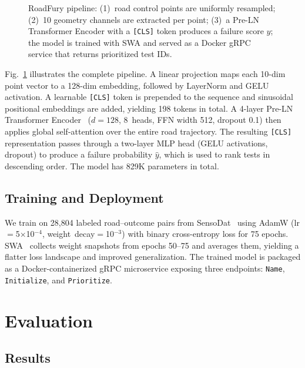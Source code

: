 \documentclass[conference]{IEEEtran}
\begin{document}
\begin{figure}[t]
{%
}
\caption{RoadFury pipeline: (1)~road control points are uniformly resampled; (2)~10 geometry channels are extracted per point; (3)~a Pre-LN Transformer Encoder with a \texttt{[CLS]} token produces a failure score $\hat{y}$; the model is trained with SWA and served as a Docker gRPC service that returns prioritized test IDs.}
\label{fig:arch}
\end{figure}

Fig.~\ref{fig:arch} illustrates the complete pipeline.
A linear projection maps each 10-dim point vector to a 128-dim embedding, followed by LayerNorm and GELU activation.
A learnable \texttt{[CLS]} token is prepended to the sequence and sinusoidal positional embeddings are added, yielding 198 tokens in total.
A 4-layer Pre-LN Transformer Encoder~\cite{b11} ($d{=}128$, 8~heads, FFN width 512, dropout 0.1) then applies global self-attention over the entire road trajectory.
The resulting \texttt{[CLS]} representation passes through a two-layer MLP head (GELU activations, dropout) to produce a failure probability $\hat{y}$, which is used to rank tests in descending order.
The model has 829K parameters in total.

\subsection{Training and Deployment}

We train on 28,804 labeled road--outcome pairs from SensoDat~\cite{b7} using AdamW (lr$=$5$\times$10$^{-4}$, weight~decay$=$10$^{-3}$) with binary cross-entropy loss for 75 epochs.
SWA~\cite{b6} collects weight snapshots from epochs 50--75 and averages them, yielding a flatter loss landscape and improved generalization.
The trained model is packaged as a Docker-containerized gRPC microservice exposing three endpoints: \texttt{Name}, \texttt{Initialize}, and \texttt{Prioritize}.

\section{Evaluation}

\subsection{Results}
\end{document}

